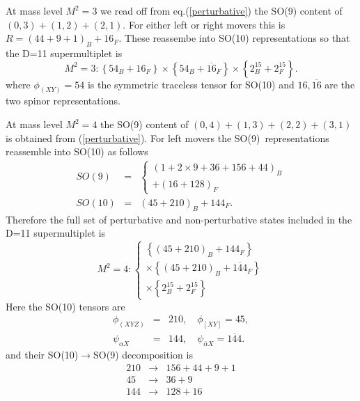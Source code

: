 At mass level $M^2=3$ we read off from eq.(\ref{perturbative}) the SO(9)
content of $(0,3)+\left( 1,2\right) +\left( 2,1\right) .$ For either left or
right movers this is $R=\left( 44+9+1\right) _B+16_F.$ These reassembe into
SO(10) representations so that the D=11 supermultiplet is
\begin{equation}
M^2=3:\left\{ 54_B+16_F\right\} \times \left\{ 54_B+\overline{16}_F\right\}
\times \left\{ 2_B^{15}+2_F^{15}\right\} .
\end{equation}
where $\phi _{(XY)}=54$ is the symmetric traceless tensor for SO(10) and $16,%
\overline{16}$ are the two spinor representations.

At mass level $M^2=4$ the SO(9) content of $(0,4)+(1,3)+\left( 2,2\right)
+\left( 3,1\right) $ is obtained from (\ref{perturbative}). For left movers
the SO(9)\ representations reassemble into SO(10) as follows
\begin{eqnarray}
SO(9) &=&\left\{
\begin{array}{l}
(1+2\times 9+36+156+44)_B \\
+\left( 16+128\right) _F
\end{array}
\right.  \label{l49} \\
SO(10) &=&\left( 45+210\right) _B+144_F.  \label{l410}
\end{eqnarray}
Therefore the full set of perturbative and non-perturbative states included
in the D=11 supermultiplet is
\begin{equation}
M^2=4:\left\{
\begin{array}{c}
\left\{ \left( 45+210\right) _B+144_F\right\} \\
\times \left\{ \left( 45+210\right) _B+\overline{144}_F\right\} \\
\times \left\{ 2_B^{15}+2_F^{15}\right\}
\end{array}
\right.
\end{equation}
Here the SO(10) tensors are
\begin{eqnarray}
\phi _{(XYZ)} &=&210,\quad \phi _{[XY]}=45, \\
\psi _{\alpha X} &=&144,\quad \psi _{\bar \alpha X}=\overline{144}.
\nonumber
\end{eqnarray}
and their SO(10)$\rightarrow $SO(9) decomposition is
\begin{eqnarray}
210 &\rightarrow &156+44+9+1 \\
45 &\rightarrow &36+9  \nonumber \\
144 &\rightarrow &128+16  \nonumber
\end{eqnarray}

